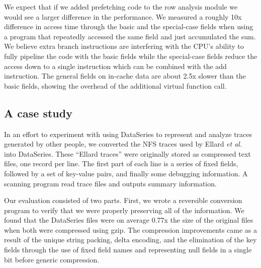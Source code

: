 \documentclass{acm_proc_article-sp}
\begin{document}
We
expect that if we added prefetching code to the row analysis module we
would see a larger difference in the performance. 
We measured a
roughly 10x difference in access time through the basic and the
special-case fields when using a program that repeatedly accessed the
same field and just accumulated the sum.  We believe 
extra branch instructions are interfering with the CPU's ability to
fully pipeline the code with the basic fields while the special-case
fields reduce the access down to a single instruction which can be
combined with the add instruction.  The general fields on in-cache
data are about 2.5x slower than the basic fields, showing the overhead
of the additional virtual function call.

\subsection{A case study}\label{sec:ellard}

In an effort to experiment with using DataSeries to represent and
analyze traces generated by other people, we converted the NFS
traces used by Ellard \textit{et al.}~\cite{ellard03} into DataSeries.  
These ``Ellard traces''
were originally stored as compressed text files, one record per line.
The first part of each line is a series of fixed fields, followed by a
set of key-value pairs, and finally some debugging information.  
A scanning program read
trace files and outputs summary information.

Our evaluation consisted of two parts.
First, we wrote a reversible conversion program to
verify that we were properly preserving all of the information.
We found that the DataSeries files were on average 0.77x the size of
the original files when both were compressed using gzip.  The
compression improvements came as a result of the unique string
packing, delta encoding, and the elimination of the key fields through
the use of fixed field names and representing null fields in a single
bit before generic compression.

\end{document}
